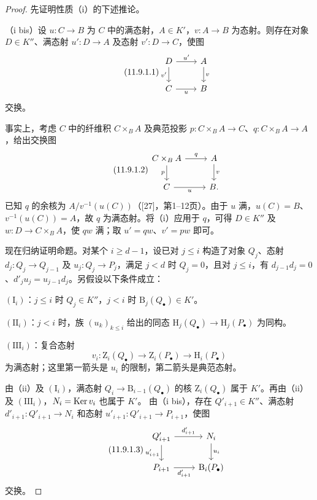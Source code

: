 \begin{proof}
先证明性质（i）的下述推论。

（i bis）设 $u:C\to B$ 为 $C$ 中的满态射，$A\in K'$，$v:A\to B$ 为态射。则存在对象 $D\in K''$、满态射 $u':D\to A$ 及态射 $v':D\to C$，使图
\begin{equation}\tag{11.9.1.1}
\begin{tikzcd}
D\arrow[r,"u'"]\arrow[d,"v'"']&A\arrow[d,"v"]\\
C\arrow[r,"u"']&B
\end{tikzcd}
\end{equation}
交换。

事实上，考虑 $C$ 中的纤维积 $C\times_B A$ 及典范投影 $p:C\times_B A\to C$、$q:C\times_B A\to A$，给出交换图
\begin{equation}\tag{11.9.1.2}
\begin{tikzcd}
C\times_B A\arrow[r,"q"]\arrow[d,"p"']&A\arrow[d,"v"]\\
C\arrow[r,"u"']&B.
\end{tikzcd}
\end{equation}
已知 $q$ 的余核为 $A/v^{-1}(u(C))$（[27]，第1--12页）。由于 $u$ 满，$u(C)=B$、$v^{-1}(u(C))=A$，故 $q$ 为满态射。将（i）应用于 $q$，可得 $D\in K''$ 及 $w:D\to C\times_B A$，使 $qw$ 满；取 $u'=qw$、$v'=pw$ 即可。

现在归纳证明命题。对某个 $i\geq d-1$，设已对 $j\leq i$ 构造了对象 $Q_j$、态射 $d_j:Q_j\to Q_{j-1}$ 及 $u_j:Q_j\to P_j$，满足 $j<d$ 时 $Q_j=0$，且对 $j\leq i$，有 $d_{j-1}d_j=0$、$d'_ju_j=u_{j-1}d_j$。另假设以下条件成立：

$(\mathrm I_i)$：$j\leq i$ 时 $Q_j\in K''$，$j<i$ 时 $\mathrm B_j(Q_\bullet)\in K'$。

$(\mathrm{II}_i)$：$j<i$ 时，族 $(u_k)_{k\leq i}$ 给出的同态 $\mathrm H_j(Q_\bullet)\to\mathrm H_j(P_\bullet)$ 为同构。

$(\mathrm{III}_i)$：复合态射
\[
v_i:\mathrm Z_i(Q_\bullet)\longrightarrow\mathrm Z_i(P_\bullet)
\longrightarrow\mathrm H_i(P_\bullet)
\]
为满态射；这里第一箭头是 $u_i$ 的限制，第二箭头是典范态射。

由（ii）及 $(\mathrm I_i)$，满态射 $Q_i\to\mathrm B_{i-1}(Q_\bullet)$ 的核 $\mathrm Z_i(Q_\bullet)$ 属于 $K'$。再由（ii）及 $(\mathrm{III}_i)$，$N_i=\operatorname{Ker} v_i$ 也属于 $K'$。
由（i bis），存在 $Q'_{i+1}\in K''$、满态射 $d'_{i+1}:Q'_{i+1}\to N_i$ 和态射 $u'_{i+1}:Q'_{i+1}\to P_{i+1}$，使图
\begin{equation}\tag{11.9.1.3}
\begin{tikzcd}
Q'_{i+1}\arrow[r,"d'_{i+1}"]\arrow[d,"u'_{i+1}"']&N_i\arrow[d,"u_i"]\\
P_{i+1}\arrow[r,"d'_{i+1}"']&\mathrm B_i(P_\bullet)
\end{tikzcd}
\end{equation}
交换。


\end{proof}
